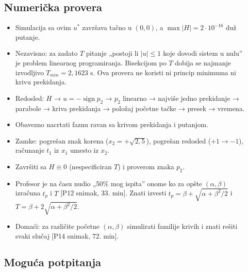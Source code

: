 \documentclass[11pt,a4paper,parskip=half,headsepline,numbers=noenddot]{scrartcl}
\DeclareRobustCommand{\izvor}[1]{{\small\color{izvorC}[#1]}}
\begin{document}
\subsection{Numerička provera}

\begin{itemize}
\item Simulacija sa ovim \(u^*\) završava tačno u \((0, 0)\), a \(\max|H| = 2\cdot10^{-16}\) duž putanje.
\item Nezavisno: za zadato \(T\) pitanje „postoji li \(|u| \le 1\) koje dovodi sistem u nulu'' je problem linearnog programiranja. Bisekcijom po \(T\) dobija se najmanje izvodljivo \(T_{min} = 2{,}1623\) s. Ova provera ne koristi ni princip minimuma ni krivu prekidanja.
\end{itemize}

\begin{ispit}[{Pitanje 8}]
\begin{itemize}
\item Redosled: \(H\) → \(u = -\operatorname{sign}p_2\) → \(p_2\) linearno → najviše jedno prekidanje → parabole → kriva prekidanja → položaj početne tačke → presek → vremena.
\item Obavezno nacrtati faznu ravan sa krivom prekidanja i putanjom.
\item Zamke: pogrešan znak korena (\(x_2 = +\sqrt{2{,}5}\)), pogrešan redosled (\(+1 \to -1\)), računanje \(t_1\) iz \(x_1\) umesto iz \(x_2\).
\item Završiti sa \(H \equiv 0\) (nespecificiran \(T\)) i proverom znaka \(p_2\).
\item Profesor je na času nudio „50\% mog ispita'' onome ko za opšte \((\alpha, \beta)\) izračuna \(t_p\) i \(T\) \izvor{P12 snimak, 33. min}. Znati izvesti \(t_p = \beta + \sqrt{\alpha + \beta^2/2}\) i \(T = \beta + 2\sqrt{\alpha + \beta^2/2}\).
\item Domaći: za različite početne \((\alpha, \beta)\) simulirati familije krivih i znati rešiti svaki slučaj \izvor{P14 snimak, 72. min}.
\end{itemize}
\end{ispit}

\subsection{Moguća potpitanja}
\end{document}
